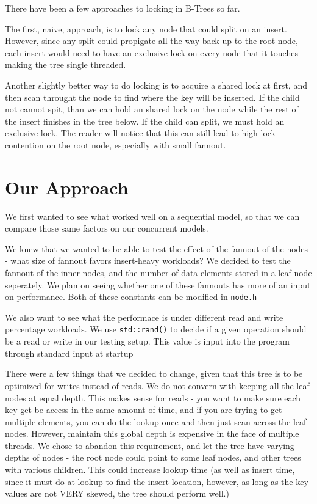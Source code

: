 \documentclass{sig-alternate}
\begin{document}
There have been a few approaches to locking in B-Trees so far.

The first, naive, approach, is to lock any node that could split on an insert.  However, since any split could propigate all the way back up to the root node, each insert would need to have an exclusive lock on every node that it touches - making the tree single threaded.

Another slightly better way to do locking is to acquire a shared lock at first, and then scan throught the node to find where the key will be inserted.  If the child not cannot spit, than we can hold an shared lock on the node while the rest of the insert finishes in the tree below.  If the child can split, we must hold an exclusive lock.  The reader will notice that this can still lead to high lock contention on the root node, especially with small fannout.

\section{Our Approach}
We first wanted to see what worked well on a sequential model, so that we can compare those same factors on our concurrent models.

We knew that we wanted to be able to test the effect of the fannout of the nodes - what size of fannout favors insert-heavy workloads? We decided to test the fannout of the inner nodes, and the number of data elements stored in a leaf node seperately.  We plan on seeing whether one of these fannouts has more of an input on performance.  Both of these constants can be modified in \texttt{node.h}

We also want to see what the performace is under different read and write percentage workloads.  We use \texttt{std::rand()} to decide if a given operation should be a read or write in our testing setup.  This value is input into the program through standard input at startup

There were a few things that we decided to change, given that this tree is to be optimized for writes instead of reads.  
We do not convern with keeping all the leaf nodes at equal depth.  This makes sense for reads - you want to make sure each key get be access in the same amount of time, and if you are trying to get multiple elements, you can do the lookup once and then just scan across the leaf nodes.  However, maintain this global depth is expensive in the face of multiple threads.  We chose to abandon this requirement, and let the tree have varying depths of nodes - the root node could point to some leaf nodes, and other trees with various children.  This could increase lookup time (as well as insert time, since it must do at lookup to find the insert location, however, as long as the key values are not VERY skewed, the tree should perform well.)
\end{document}

